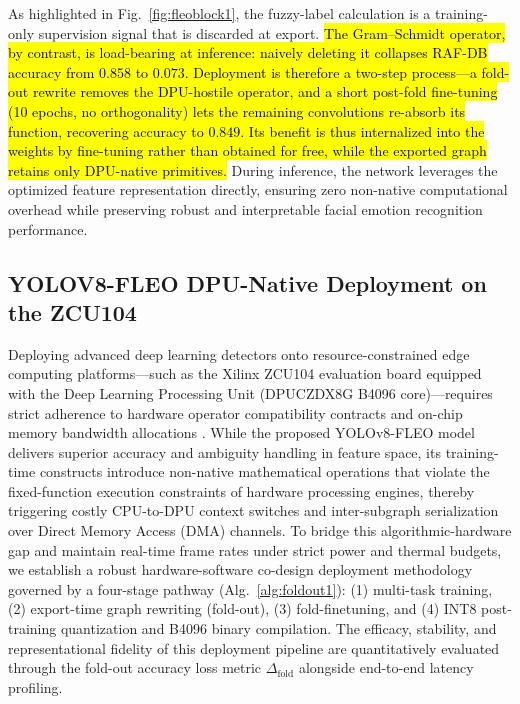 \documentclass[algorithms,article,submit,moreauthors]{Definitions/mdpi}
\newcommand{\rev}[1]{\hl{#1}}        %
\begin{document}
As highlighted in Fig.~\ref{fig:fleoblock1}, the fuzzy-label calculation is a training-only supervision signal that is discarded at export. \rev{The Gram--Schmidt operator, by contrast, is load-bearing at inference: naively deleting it collapses RAF-DB accuracy from \mbox{$0.858$} to \mbox{$0.073$}. Deployment is therefore a two-step process---a fold-out rewrite removes the DPU-hostile operator, and a short post-fold fine-tuning (10 epochs, no orthogonality) lets the remaining convolutions re-absorb its function, recovering accuracy to \mbox{$0.849$}. Its benefit is thus internalized into the weights by fine-tuning rather than obtained for free, while the exported graph retains only DPU-native primitives.} During inference, the network leverages the optimized feature representation directly, ensuring zero non-native computational overhead while preserving robust and interpretable facial emotion recognition performance.
\subsection{YOLOV8-FLEO DPU-Native Deployment on the ZCU104}
\label{sec:hard}
Deploying advanced deep learning detectors onto resource-constrained edge computing platforms---such as the Xilinx ZCU104 evaluation board equipped with the Deep Learning Processing Unit (DPUCZDX8G B4096 core)---requires strict adherence to hardware operator compatibility contracts and on-chip memory bandwidth allocations \citep{bib25}. While the proposed YOLOv8-FLEO model delivers superior accuracy and ambiguity handling in feature space, its training-time constructs introduce non-native mathematical operations that violate the fixed-function execution constraints of hardware processing engines, thereby triggering costly CPU-to-DPU context switches and inter-subgraph serialization over Direct Memory Access (DMA) channels. To bridge this algorithmic-hardware gap and maintain real-time frame rates under strict power and thermal budgets, we establish a robust hardware-software co-design deployment methodology governed by a four-stage pathway (Alg.~\ref{alg:foldout1}): (1) multi-task training, (2) export-time graph rewriting (fold-out), (3) fold-finetuning, and (4) INT8 post-training quantization and B4096 binary compilation. The efficacy, stability, and representational fidelity of this deployment pipeline are quantitatively evaluated through the fold-out accuracy loss metric $\Delta_{\mathrm{fold}}$ alongside end-to-end latency profiling.
\end{document}
